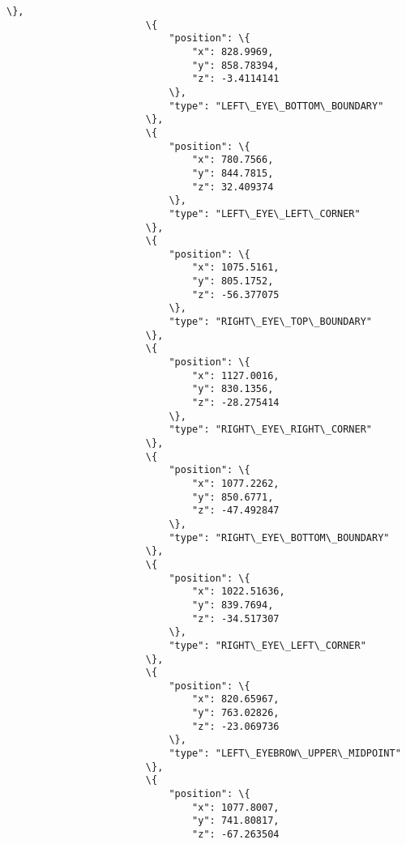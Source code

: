 \documentclass[11pt]{article}
\begin{document}
\begin{Verbatim}[commandchars=\\\{\}]
                        \},
                        \{
                            "position": \{
                                "x": 828.9969,
                                "y": 858.78394,
                                "z": -3.4114141
                            \},
                            "type": "LEFT\_EYE\_BOTTOM\_BOUNDARY"
                        \},
                        \{
                            "position": \{
                                "x": 780.7566,
                                "y": 844.7815,
                                "z": 32.409374
                            \},
                            "type": "LEFT\_EYE\_LEFT\_CORNER"
                        \},
                        \{
                            "position": \{
                                "x": 1075.5161,
                                "y": 805.1752,
                                "z": -56.377075
                            \},
                            "type": "RIGHT\_EYE\_TOP\_BOUNDARY"
                        \},
                        \{
                            "position": \{
                                "x": 1127.0016,
                                "y": 830.1356,
                                "z": -28.275414
                            \},
                            "type": "RIGHT\_EYE\_RIGHT\_CORNER"
                        \},
                        \{
                            "position": \{
                                "x": 1077.2262,
                                "y": 850.6771,
                                "z": -47.492847
                            \},
                            "type": "RIGHT\_EYE\_BOTTOM\_BOUNDARY"
                        \},
                        \{
                            "position": \{
                                "x": 1022.51636,
                                "y": 839.7694,
                                "z": -34.517307
                            \},
                            "type": "RIGHT\_EYE\_LEFT\_CORNER"
                        \},
                        \{
                            "position": \{
                                "x": 820.65967,
                                "y": 763.02826,
                                "z": -23.069736
                            \},
                            "type": "LEFT\_EYEBROW\_UPPER\_MIDPOINT"
                        \},
                        \{
                            "position": \{
                                "x": 1077.8007,
                                "y": 741.80817,
                                "z": -67.263504

\end{Verbatim}
\end{document}
